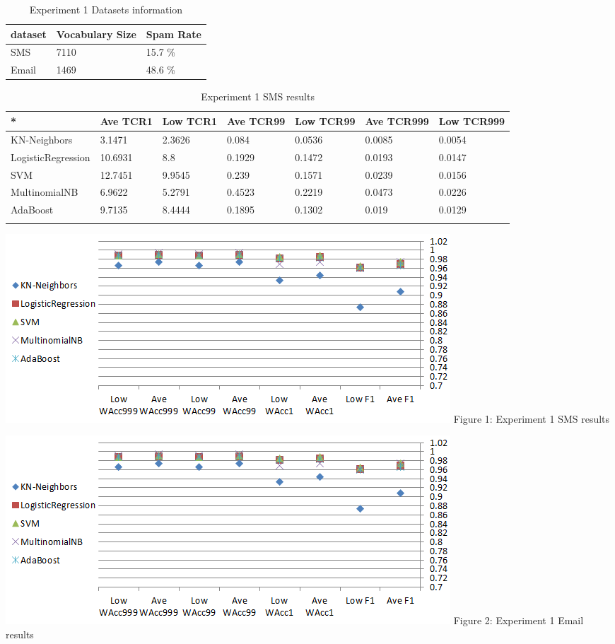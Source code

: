 \documentclass[11pt,a4paper]{article}
\begin{document}



\begin{table}[t!]
\centering
\begin{tabular}{lll}
  dataset & Vocabulary Size & Spam Rate\\
  \hline
  SMS & 7110 &15.7 \% \\
  Email & 1469 &48.6 \% \\
\end{tabular}
\caption{Experiment 1 Datasets information}
\end{table}


\begin{table}[t!]
\centering
\begin{tabular}{lllllll}
 *& Ave TCR1 &Low TCR1&Ave TCR99&Low TCR99&Ave TCR999&Low TCR999\\
  \hline
  KN-Neighbors& 3.1471&	2.3626&	0.084&	0.0536&	0.0085&	0.0054	\\
LogisticRegression& 10.6931&	8.8&	0.1929&	0.1472&	0.0193&	0.0147	\\
SVM& 12.7451&	9.9545&	0.239&	0.1571&	0.0239&	0.0156	\\
MultinomialNB& 6.9622&	5.2791&	0.4523&	0.2219&	0.0473&	0.0226	\\
AdaBoost& 9.7135&	8.4444	&0.1895&	0.1302&	0.019&	0.0129	\\

 \\
\end{tabular}
\caption{Experiment 1 SMS results}
\end{table}

\includegraphics[scale=0.4]{1}
Figure 1: Experiment 1 SMS results

\includegraphics[scale=0.4]{1}
Figure 2: Experiment 1 Email results
\end{document}
